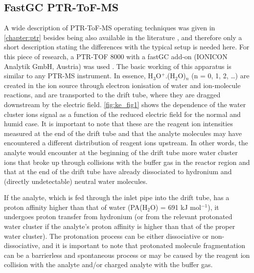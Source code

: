 \subsection{FastGC PTR-ToF-MS}
A wide description of PTR-ToF-MS operating techniques was given in \autoref{chapter:ptr} besides being also available in the literature \cite{ellis2013proton}, and therefore only a short description stating the differences with the typical setup is needed here.
For this piece of research,  a PTR-TOF 8000 with a fastGC add-on (IONICON Analytik GmbH, Austria) was used \cite{GRAUS20101037,jordan2009online}.
The basic working of this apparatus is similar to any PTR-MS instrument. In essence, H$_3$O$^+$.(H$_2$O)$_n$ (n = 0, 1, 2, …) are created in the ion source through electron ionisation of water and ion-molecule reactions, and are transported to the drift tube, where they are dragged downstream by the electric field. \autoref{fig:ke_fig1} shows the dependence of the water cluster ions signal as a function of the reduced electric field for the normal and humid case.
It is important to note that these are the reagent ion intensities measured at the end of the drift tube and that the analyte molecules may have encountered a different distribution of reagent ions upstream. In other words, the analyte would encounter at the beginning of the drift tube more water cluster ions that broke up through collisions with the buffer gas in the reactor region and that at the end of the drift tube have already dissociated to hydronium and (directly undetectable) neutral water molecules.



If the analyte, which is fed through the inlet pipe into the drift tube, has a proton affinity higher than that of water (PA(H$_2$O) = 691 kJ mol$^{-1}$), it undergoes proton transfer from hydronium (or from the relevant protonated water cluster if the analyte's proton affinity is higher than that of the proper water cluster).
The protonation process can be either dissociative or non-dissociative, and it is important to note that protonated molecule fragmentation can be a barrierless and spontaneous process or may be caused by the reagent ion collision with the analyte and/or charged analyte with the buffer gas.





